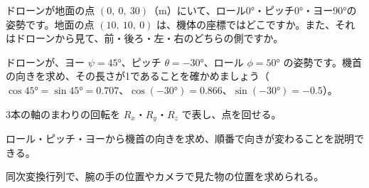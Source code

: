 \bkproblem ドローンが地面の点 $(0,\ 0,\ 30)$（m）にいて、ロール0°・ピッチ0°・ヨー90°の姿勢です。地面の点 $(10,\ 10,\ 0)$ は、機体の座標ではどこですか。また、それはドローンから見て、前・後ろ・左・右のどちらの側ですか。

\bkproblem ドローンが、ヨー $\psi=45°$、ピッチ $\theta=-30°$、ロール $\phi=50°$ の姿勢です。機首の向きを求め、その長さが1であることを確かめましょう（$\cos45°=\sin45°=0.707$、$\cos(-30°)=0.866$、$\sin(-30°)=-0.5$）。

\begin{furikaeri}
\begin{checklist}
\item 3本の軸のまわりの回転を $R_x$・$R_y$・$R_z$ で表し、点を回せる。
\item ロール・ピッチ・ヨーから機首の向きを求め、順番で向きが変わることを説明できる。
\item 同次変換行列で、腕の手の位置やカメラで見た物の位置を求められる。
\end{checklist}
\end{furikaeri}

